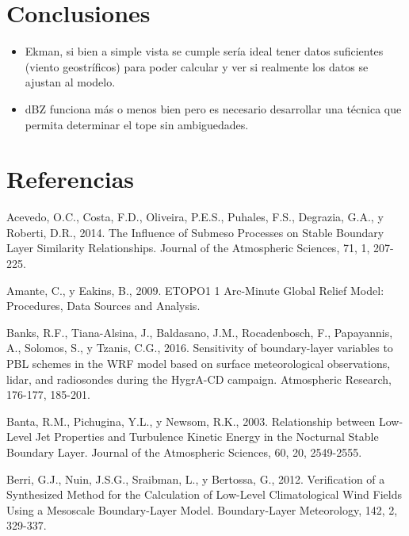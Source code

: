 \documentclass[12pt,spanish,oneside]{book}
\providecommand{\tightlist}{%
  \setlength{\itemsep}{0pt}\setlength{\parskip}{0pt}}
\begin{document}
\chapter{Conclusiones}\label{conclusiones}

\begin{itemize}
\tightlist
\item
  Ekman, si bien a simple vista se cumple sería ideal tener datos
  suficientes (viento geostríficos) para poder calcular y ver si
  realmente los datos se ajustan al modelo.
\item
  dBZ funciona más o menos bien pero es necesario desarrollar una
  técnica que permita determinar el tope sin ambiguedades.
\end{itemize}

\chapter*{Referencias}\label{referencias}

\hypertarget{refs}{}
\hypertarget{ref-Acevedo2014}{}
Acevedo, O.C., Costa, F.D., Oliveira, P.E.S., Puhales, F.S., Degrazia,
G.A., y Roberti, D.R., 2014. The Influence of Submeso Processes on
Stable Boundary Layer Similarity Relationships. Journal of the
Atmospheric Sciences, 71, 1, 207-225.

\hypertarget{ref-Amante2009}{}
Amante, C., y Eakins, B., 2009. ETOPO1 1 Arc-Minute Global Relief Model:
Procedures, Data Sources and Analysis.

\hypertarget{ref-Banks2016}{}
Banks, R.F., Tiana-Alsina, J., Baldasano, J.M., Rocadenbosch, F.,
Papayannis, A., Solomos, S., y Tzanis, C.G., 2016. Sensitivity of
boundary-layer variables to PBL schemes in the WRF model based on
surface meteorological observations, lidar, and radiosondes during the
HygrA-CD campaign. Atmospheric Research, 176-177, 185-201.

\hypertarget{ref-Banta2003}{}
Banta, R.M., Pichugina, Y.L., y Newsom, R.K., 2003. Relationship between
Low-Level Jet Properties and Turbulence Kinetic Energy in the Nocturnal
Stable Boundary Layer. Journal of the Atmospheric Sciences, 60, 20,
2549-2555.

\hypertarget{ref-Berri2012}{}
Berri, G.J., Nuin, J.S.G., Sraibman, L., y Bertossa, G., 2012.
Verification of a Synthesized Method for the Calculation of Low-Level
Climatological Wind Fields Using a Mesoscale Boundary-Layer Model.
Boundary-Layer Meteorology, 142, 2, 329-337.
\end{document}
